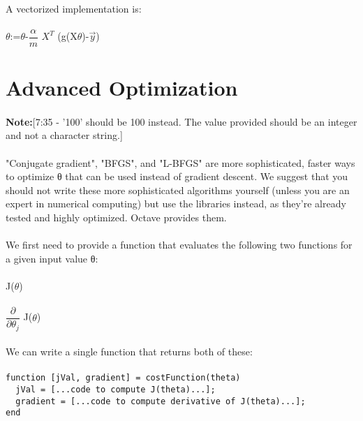 \documentclass[UTF8]{ctexart}
\begin{document}
\paragraph{}
A vectorized implementation is:
\paragraph{}
$\theta$:=$\theta$-$\dfrac{\alpha}{m}$ $X^{T}$ (g(X$\theta$)-$\vec{y}$)
\newpage
\section{Advanced Optimization}
\paragraph{}
\textbf{Note:}[7:35 - '100' should be 100 instead. The value provided should be an integer and not a character string.]
\paragraph{}
"Conjugate gradient", "BFGS", and "L-BFGS" are more sophisticated, faster ways to optimize θ that can be used instead of gradient descent. We suggest that you should not write these more sophisticated algorithms yourself (unless you are an expert in numerical computing) but use the libraries instead, as they're already tested and highly optimized. Octave provides them.
\paragraph{}
We first need to provide a function that evaluates the following two functions for a given input value θ:
\paragraph{}
J($\theta$)
\paragraph{}
$\dfrac{\partial}{\partial\theta_{j}}$ J($\theta$)
\paragraph{}
We can write a single function that returns both of these:
\paragraph{}
\begin{algorithm}
\begin{verbatim}
function [jVal, gradient] = costFunction(theta)
  jVal = [...code to compute J(theta)...];
  gradient = [...code to compute derivative of J(theta)...];
end
\end{verbatim}
\end{algorithm}
\end{document}

